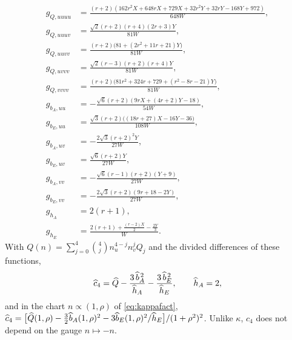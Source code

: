 \begin{align*}
g_{Q,uuuu}&=\frac{(r+2)(162r^2X+648rX+729X+32r^2Y+32rY-168Y+972)}{648W},\\
g_{Q,uuuv}&=\frac{\sqrt2(r+2)(r+4)(2r+3)Y}{81W},\\
g_{Q,uuvv}&=\frac{(r+2)\bigl(81+(2r^2+11r+21)Y\bigr)}{81W},\\
g_{Q,uvvv}&=\frac{\sqrt2(r-3)(r+2)(r+4)Y}{81W},\\
g_{Q,vvvv}&=\frac{(r+2)\bigl(81r^2+324r+729+(r^2-8r-21)Y\bigr)}{81W},\\
g_{b_A,uu}&=-\frac{\sqrt6(r+2)(9rX+(4r+2)Y-18)}{54W},\\
g_{b_E,uu}&=\frac{\sqrt3(r+2)\bigl((18r+27)X-16Y-36\bigr)}{108W},\\
g_{b_A,uv}&=-\frac{2\sqrt3(r+2)^2Y}{27W},\\
g_{b_E,uv}&=\frac{\sqrt6(r+2)Y}{27W},\\
g_{b_A,vv}&=-\frac{\sqrt6(r-1)(r+2)(Y+9)}{27W},\\
g_{b_E,vv}&=-\frac{2\sqrt3(r+2)(9r+18-2Y)}{27W},\\
g_{h_A}&=2(r+1),\\
g_{h_E}&=\frac{2(r+1)+\frac{(r-2)X}{2}-\frac{2Y}{3}}{W}.
\end{align*}
With $Q(n)=\sum_{j=0}^4\binom4j n_u^{4-j}n_v^{j}Q_j$ and the divided differences of these functions,
\[
\widehat{c}_4=\widehat Q-\frac{3\,\widehat b_A^{\,2}}{\widehat h_A}-\frac{3\,\widehat b_E^{\,2}}{\widehat h_E},\qquad \widehat h_A=2,
\]
and in the chart $n\propto(1,\rho)$ of \eqref{eq:kappafact},
$\widehat{c}_4=\bigl[\widehat Q(1,\rho)-\tfrac32\widehat b_A(1,\rho)^2-3\widehat b_E(1,\rho)^2/\widehat h_E\bigr]/(1+\rho^2)^2$.
Unlike $\kappa$, $c_4$ does not depend on the gauge $n\mapsto-n$.
